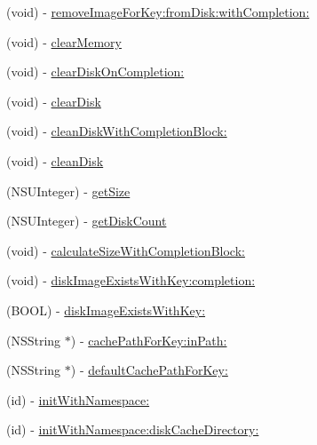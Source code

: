\begin{DoxyCompactItemize}
\item 
(void) -\/ \mbox{\hyperlink{interface_s_d_image_cache_abf0e1a46fc6db455e464efda62fcc55d}{remove\+Image\+For\+Key\+:from\+Disk\+:with\+Completion\+:}}
\item 
(void) -\/ \mbox{\hyperlink{interface_s_d_image_cache_a931b161c379dd952affffe8c0544527d}{clear\+Memory}}
\item 
(void) -\/ \mbox{\hyperlink{interface_s_d_image_cache_ab936a83a1b711209d30f9051cc3658cc}{clear\+Disk\+On\+Completion\+:}}
\item 
(void) -\/ \mbox{\hyperlink{interface_s_d_image_cache_a2a9bcc872d749959df5dd458247b3301}{clear\+Disk}}
\item 
(void) -\/ \mbox{\hyperlink{interface_s_d_image_cache_a1f82c522f4cb0fafdb063291cbcb23d0}{clean\+Disk\+With\+Completion\+Block\+:}}
\item 
(void) -\/ \mbox{\hyperlink{interface_s_d_image_cache_a491f75cc5c1df37dce478c00f898a0d8}{clean\+Disk}}
\item 
(N\+S\+U\+Integer) -\/ \mbox{\hyperlink{interface_s_d_image_cache_a934d85543e92fdb3ac35cbdff3e668d3}{get\+Size}}
\item 
(N\+S\+U\+Integer) -\/ \mbox{\hyperlink{interface_s_d_image_cache_abc59ee03f3afc7d9fa202a0790f8b5c0}{get\+Disk\+Count}}
\item 
(void) -\/ \mbox{\hyperlink{interface_s_d_image_cache_a276a37cdab08d116906f65040bad9c99}{calculate\+Size\+With\+Completion\+Block\+:}}
\item 
(void) -\/ \mbox{\hyperlink{interface_s_d_image_cache_a2baefc1300fcd3c57a25b5326dda8834}{disk\+Image\+Exists\+With\+Key\+:completion\+:}}
\item 
(B\+O\+OL) -\/ \mbox{\hyperlink{interface_s_d_image_cache_a67feea7b5568f427dfcf4f380abc1ba7}{disk\+Image\+Exists\+With\+Key\+:}}
\item 
(N\+S\+String $\ast$) -\/ \mbox{\hyperlink{interface_s_d_image_cache_a8dffa7933d6dcd6668331d03d29e2ad0}{cache\+Path\+For\+Key\+:in\+Path\+:}}
\item 
(N\+S\+String $\ast$) -\/ \mbox{\hyperlink{interface_s_d_image_cache_a591ff2cb8bcd813969b33c610c569bdc}{default\+Cache\+Path\+For\+Key\+:}}
\item 
(id) -\/ \mbox{\hyperlink{interface_s_d_image_cache_a586dcc0a4f8b68e5866b8d2c7bdce7db}{init\+With\+Namespace\+:}}
\item 
(id) -\/ \mbox{\hyperlink{interface_s_d_image_cache_a92cb9299f37364e27e59f5379b076e05}{init\+With\+Namespace\+:disk\+Cache\+Directory\+:}}
\item 

\end{DoxyCompactItemize}
